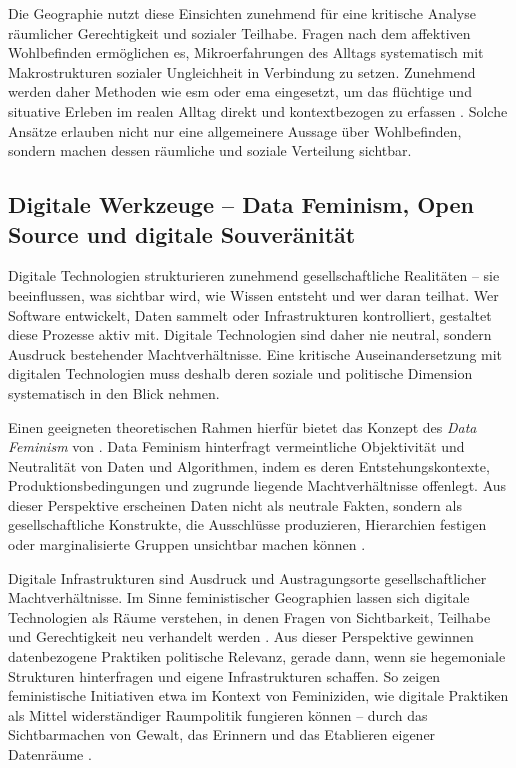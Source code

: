 Die Geographie nutzt diese Einsichten zunehmend für eine kritische Analyse räumlicher Gerechtigkeit und sozialer Teilhabe. Fragen nach dem affektiven Wohlbefinden ermöglichen es, Mikroerfahrungen des Alltags systematisch mit Makrostrukturen sozialer Ungleichheit in Verbindung zu setzen. Zunehmend werden daher Methoden wie \acrfull{esm} oder \acrfull{ema} eingesetzt, um das flüchtige und situative Erleben im realen Alltag direkt und kontextbezogen zu erfassen \parencite{songRecallBiasIntegrating2025}. Solche Ansätze erlauben nicht nur eine allgemeinere Aussage über Wohlbefinden, sondern machen dessen räumliche und soziale Verteilung sichtbar.

\subsection{Digitale Werkzeuge -- Data Feminism, Open Source und digitale Souveränität}

Digitale Technologien strukturieren zunehmend gesellschaftliche Realitäten -- sie beeinflussen, was sichtbar wird, wie Wissen entsteht und wer daran teilhat. Wer Software entwickelt, Daten sammelt oder Infrastrukturen kontrolliert, gestaltet diese Prozesse aktiv mit. Digitale Technologien sind daher nie neutral, sondern Ausdruck bestehender Machtverhältnisse. Eine kritische Auseinandersetzung mit digitalen Technologien muss deshalb deren soziale und politische Dimension systematisch in den Blick nehmen.

Einen geeigneten theoretischen Rahmen hierfür bietet das Konzept des \textit{Data Feminism} von \textcite{dignazioDataFeminism2020}. Data Feminism hinterfragt vermeintliche Objektivität und Neutralität von Daten und Algorithmen, indem es deren Entstehungskontexte, Produktionsbedingungen und zugrunde liegende Machtverhältnisse offenlegt. Aus dieser Perspektive erscheinen Daten nicht als neutrale Fakten, sondern als gesellschaftliche Konstrukte, die Ausschlüsse produzieren, Hierarchien festigen oder marginalisierte Gruppen unsichtbar machen können \parencite{elwoodFeministDigitalGeographies2018}.

Digitale Infrastrukturen sind Ausdruck und Austragungsorte gesellschaftlicher Machtverhältnisse. Im Sinne feministischer Geographien lassen sich digitale Technologien als Räume verstehen, in denen Fragen von Sichtbarkeit, Teilhabe und Gerechtigkeit neu verhandelt werden \parencite{elwoodFeministDigitalGeographies2018}. Aus dieser Perspektive gewinnen datenbezogene Praktiken politische Relevanz, gerade dann, wenn sie hegemoniale Strukturen hinterfragen und eigene Infrastrukturen schaffen. So zeigen feministische Initiativen etwa im Kontext von Feminiziden, wie digitale Praktiken als Mittel widerständiger Raumpolitik fungieren können -- durch das Sichtbarmachen von Gewalt, das Erinnern und das Etablieren eigener Datenräume \parencite{dignazioGeographiesMissingData2024}.


